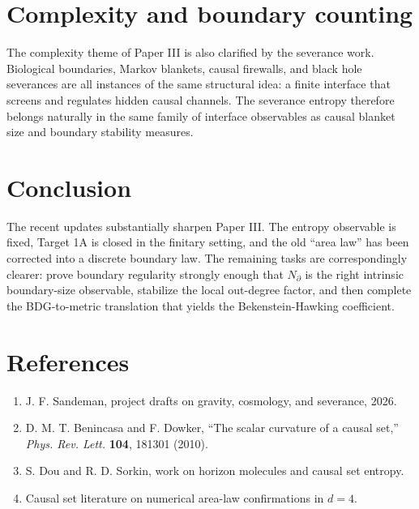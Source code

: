 \documentclass[11pt]{article}
\begin{document}
\section{Complexity and boundary counting}
The complexity theme of Paper III is also clarified by the severance work. Biological boundaries, Markov blankets, causal firewalls, and black hole severances are all instances of the same structural idea: a finite interface that screens and regulates hidden causal channels. The severance entropy therefore belongs naturally in the same family of interface observables as causal blanket size and boundary stability measures.

\section{Conclusion}
The recent updates substantially sharpen Paper III. The entropy observable is fixed, Target 1A is closed in the finitary setting, and the old ``area law'' has been corrected into a discrete boundary law. The remaining tasks are correspondingly clearer: prove boundary regularity strongly enough that $N_\partial$ is the right intrinsic boundary-size observable, stabilize the local out-degree factor, and then complete the BDG-to-metric translation that yields the Bekenstein-Hawking coefficient.

\section*{References}
\begin{enumerate}[leftmargin=1.5em]
\item J. F. Sandeman, project drafts on gravity, cosmology, and severance, 2026.
\item D. M. T. Benincasa and F. Dowker, ``The scalar curvature of a causal set,'' \emph{Phys. Rev. Lett.} \textbf{104}, 181301 (2010).
\item S. Dou and R. D. Sorkin, work on horizon molecules and causal set entropy.
\item Causal set literature on numerical area-law confirmations in $d=4$.
\end{enumerate}
\end{document}
